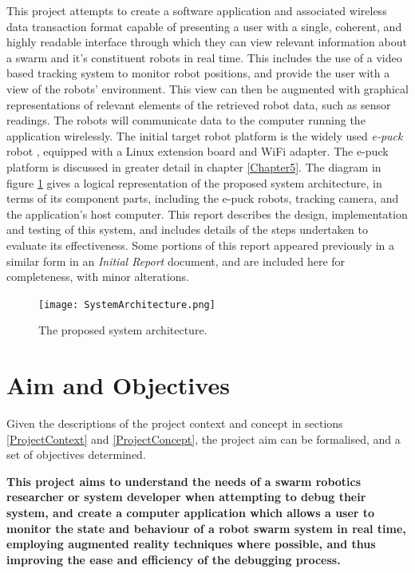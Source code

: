 This project attempts to create a software application and associated wireless data transaction format capable of presenting a user with a single, coherent, and highly readable interface through which they can view relevant information about a swarm and it's constituent robots in real time. This includes the use of a video based tracking system to monitor robot positions, and provide the user with a view of the robots' environment. This view can then be augmented with graphical representations of relevant elements of the retrieved robot data, such as sensor readings. The robots will communicate data to the computer running the application wirelessly. The initial target robot platform is the widely used \textit{e-puck} robot \cite{epuck}, equipped with a Linux extension board and WiFi adapter. The e-puck platform is discussed in greater detail in chapter \ref{Chapter5}. The diagram in figure \ref{fig:SystemArchitecture} gives a logical representation of the proposed system architecture, in terms of its component parts, including the e-puck robots, tracking camera, and the application's host computer. This report describes the design, implementation and testing of this system, and includes details of the steps undertaken to evaluate its effectiveness. Some portions of this report appeared previously in a similar form in an \textit{Initial Report} document, and are included here for completeness, with minor alterations.

\begin{figure}
	\begin{center}
	\texttt{[image: SystemArchitecture.png]}
	\decoRule
	\caption[Proposed system architecture]{The proposed system architecture.}
	\label{fig:SystemArchitecture}
	\end{center}
\end{figure}


\section{Aim and Objectives}
Given the descriptions of the project context and concept in sections \ref{ProjectContext} and \ref{ProjectConcept}, the project aim can be formalised, and a set of objectives determined. 

\textbf{This project aims to understand the needs of a swarm robotics researcher or system developer when attempting to debug their system, and create a computer application which allows a user to monitor the state and behaviour of a robot swarm system in real time, employing augmented reality techniques where possible, and thus improving the ease and efficiency of the debugging process.}


